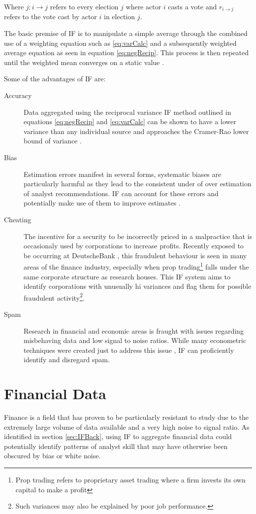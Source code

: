Where $j:i\rightarrow j$ refers to every election $j$ where actor $i$ casts a vote and $r_{i\rightarrow j}$ refers to the vote cast by actor $i$ in election $j$. 

The basic premise of IF is to manipulate a simple average through the combined use of a weighting equation such as \ref{eq:varCalc} and a subsequently weighted average equation as seen in equation \ref{eq:negRecip}. This process is then repeated until the weighted mean converges on a static value \cite{laureti2006information}.

Some of the advantages of IF are:
\begin{description}
    \item[Accuracy] Data aggregated using the reciprocal variance IF method outlined in equations \ref{eq:negRecip} and \ref{eq:varCalc} can be shown to have a lower variance than any individual source and approaches the Cramer-Rao lower bound of variance \cite{ifNotes4121}.
    \item[Bias] Estimation errors manifest in several forms, systematic biases are particularly harmful as they lead to the consistent under of over estimation of analyst recommendations. IF can account for these errors and potentially make use of them to improve estimates \cite{ignjatovic2009computing}.
    \item[Cheating] The incentive for a security to be incorrectly priced in a malpractice that is occasionaly used by corporations to increase profits. Recently exposed to be occurring at DeutscheBank \cite{sillyDeutsche}, this fraudulent behaviour is seen in many areas of the finance industry, especially when prop trading\footnote{Prop trading refers to proprietary asset trading where a firm invests its own capital to make a profit} falls under the same corporate structure as research houses. This IF system aims to identify corporations with unusually hi variances and flag them for possible fraudulent activity\footnote{Such variances may also be explained by poor job performance.}.
    \item[Spam] Research in financial and economic areas is fraught with issues regarding misbehaving data and low signal to noise ratios. While many econometric techniques were created just to address this issue \cite{juselius2014testing}, IF can proficiently identify and disregard spam.
\end{description}

\clearpage
\section{Financial Data}
Finance is a field that has proven to be particularly resistant to study due to the extremely large volume of data available and a very high noise to signal ratio\cite{juselius2014testing}. As identified in section \ref{sec:IFBack}, using IF to aggregate financial data could potentially identify patterns of analyst skill that may have otherwise been obscured by bias or white noise.

